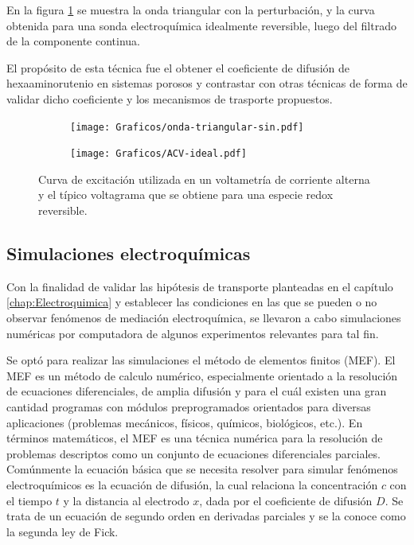 	 		En la figura \ref{fig:ACV_ideal} se muestra la onda triangular con la perturbación, y la curva obtenida para una sonda electroquímica idealmente reversible, luego del filtrado de la componente continua.

	 		El propósito de esta técnica fue el obtener el coeficiente de difusión de hexaaminorutenio en sistemas porosos y contrastar con otras técnicas de forma de validar dicho coeficiente y los mecanismos de trasporte propuestos. 

	 			 \begin{figure}[hb!]
			  		  \begin{subfigure}[t]{0.495\textwidth}
			  		  \texttt{[image: Graficos/onda-triangular-sin.pdf]}
			  		  \end{subfigure}
			  		  \begin{subfigure}[t]{0.495\textwidth}
			  		  \texttt{[image: Graficos/ACV-ideal.pdf]}
			  		  \end{subfigure}
			  		  \caption[Voltamperometria ideal reversible]{Curva de excitación utilizada en un voltametría de corriente alterna y el típico voltagrama que se obtiene para una especie redox reversible.}
			  		  \label{fig:ACV_ideal}
			  		  \end{figure}
			
	 \subsection{Simulaciones electroquímicas}\label{simulacion}

	 	 Con la finalidad de validar las hipótesis de transporte planteadas en el capítulo \ref{chap:Electroquimica} y establecer las condiciones en las que se pueden o no observar fenómenos de mediación electroquímica, se llevaron a cabo simulaciones numéricas por computadora de algunos experimentos relevantes para tal fin.

	 	 Se optó para realizar las simulaciones el método de elementos finitos (MEF). El MEF es un método de calculo numérico, especialmente orientado a la resolución de ecuaciones diferenciales, de amplia difusión y para el cuál existen una gran cantidad programas con módulos preprogramados orientados para diversas aplicaciones (problemas mecánicos, físicos, químicos, biológicos, etc.). En términos matemáticos, el MEF es una técnica numérica para la resolución de problemas descriptos como un conjunto de ecuaciones diferenciales parciales. Comúnmente la ecuación básica que se necesita resolver para simular fenómenos electroquímicos es la ecuación de difusión, la cual relaciona la concentración $c$ con el tiempo $t$ y la distancia al electrodo $x$, dada por el coeficiente de difusión $D$.\cite{Britz2005,Nann2003} Se trata de un ecuación de segundo orden en derivadas parciales y se la conoce como la segunda ley de Fick.\cite{fick1855}

